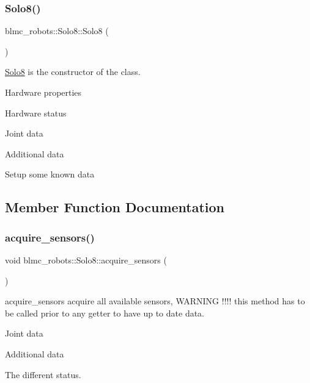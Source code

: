 \subsubsection{\texorpdfstring{Solo8()}{Solo8()}}
{\footnotesize\ttfamily blmc\+\_\+robots\+::\+Solo8\+::\+Solo8 (\begin{DoxyParamCaption}{ }\end{DoxyParamCaption})}



\hyperlink{classblmc__robots_1_1Solo8}{Solo8} is the constructor of the class. 

Hardware properties

Hardware status

Joint data

Additional data

Setup some known data

\subsection{Member Function Documentation}
\mbox{\label{classblmc__robots_1_1Solo8_a2ba66edbb1dc4b9fddb9e9978f0fd9e7}} 
\subsubsection{\texorpdfstring{acquire\+\_\+sensors()}{acquire\_sensors()}}
{\footnotesize\ttfamily void blmc\+\_\+robots\+::\+Solo8\+::acquire\+\_\+sensors (\begin{DoxyParamCaption}{ }\end{DoxyParamCaption})}



acquire\+\_\+sensors acquire all available sensors, W\+A\+R\+N\+I\+NG !!!! this method has to be called prior to any getter to have up to date data. 

Joint data

Additional data

The different status.\mbox{\label{classblmc__robots_1_1Solo8_adb4de0ff0c5cc2159a1e3b2f32955198}} 
